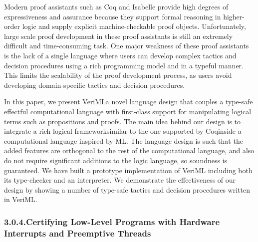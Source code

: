 \documentclass[12pt,twoside]{article}
\begin{document}
Modern proof assistants such as Coq and Isabelle provide high degrees
of expressiveness and assurance because they support formal reasoning
in higher-order logic and supply explicit machine-checkable proof
objects. Unfortunately, large scale proof development in these proof
assistants is still an extremely difficult and time-consuming
task. One major weakness of these proof assistants is the lack of a
single language where users can develop complex tactics and decision
procedures using a rich programming model and in a typeful
manner. This limits the scalability of the proof development process,
as users avoid developing domain-specific tactics and decision
procedures.%

In this paper, we present VeriML\textemdash{}a novel language design that
couples a type-safe effectful computational language with first-class
support for manipulating logical terms such as propositions and
proofs. The main idea behind our design is to integrate a rich logical
framework\textemdash{}similar to the one supported by Coq\textemdash{}inside a
computational language inspired by ML. The language design is such
that the added features are orthogonal to the rest of the
computational language, and also do not require significant additions
to the logic language, so soundness is guaranteed. We have built a
prototype implementation of VeriML including both its type-checker and
an interpreter. We demonstrate the effectiveness of our design by
showing a number of type-safe tactics and decision procedures written
in VeriML.%

\subsubsection{3.0.4.\hspace*{0.5em}Certifying Low-Level Programs with Hardware Interrupts and Preemptive Threads}\label{sec-certifying-low-level-programs-with-hardware-interrupts-and-preemptive-threads}%
\end{document}
